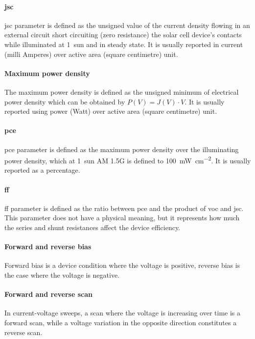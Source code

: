 \paragraph{\Glsdesc{jsc}} \Gls{jsc} parameter is defined as the unsigned value of the current density flowing in an external circuit short circuiting (zero resistance) the solar cell device's contacts while illuminated at 1~sun and in steady state. It is usually reported in current (milli Amperes) over active area (square centimetre) unit.

\paragraph{Maximum power density} The maximum power density is defined as the unsigned minimum of electrical power density which can be obtained by $P(V) = J(V) \cdot V$. It is usually reported using power (Watt) over active area (square centimetre) unit.

\paragraph{\Glsdesc{pce}} \Gls{pce} parameter is defined as the maximum power density over the illuminating power density, which at 1~sun AM 1.5G is defined to \SI{100}{\mW\per\square\cm}. It is usually reported as a percentage.

\paragraph{\Glsdesc{ff}} \Gls{ff} parameter is defined as the ratio between \gls{pce} and the product of \gls{voc} and \gls{jsc}. This parameter does not have a physical meaning, but it represents how much the series and shunt resistances affect the device efficiency.

\paragraph{Forward and reverse bias} Forward bias is a device condition where the voltage is positive, reverse bias is the case where the voltage is negative.

\paragraph{Forward and reverse scan} In current-voltage sweeps, a scan where the voltage is increasing over time is a forward scan, while a voltage variation in the opposite direction constitutes a reverse scan.

